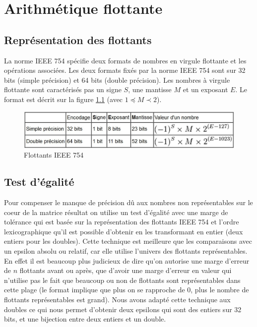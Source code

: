 \documentclass[a4paper, 10pt]{report}
\begin{document}
\chapter{Arithmétique flottante}
\label{chap:arith}

\section{Représentation des flottants}
La norme IEEE 754 spécifie deux formats de nombres en virgule flottante et les opérations associées.
Les deux formats fixés par la norme IEEE 754 sont sur 32 bits (simple précision) et 64 bits (double précision).
Les nombres à virgule flottante sont caractérisés pas un signe $S$, une mantisse $M$ et un exposant $E$.
Le format est décrit sur la figure \ref{fig:IEEE754} (avec $1 \preceq M \prec 2$).
\begin{figure}
\center
\includegraphics[scale=0.5]{IEEE754.jpg}
\caption{Flottants IEEE 754}
\label{fig:IEEE754}
\end{figure}

\section{Test d'égalité}
Pour compenser le manque de précision dû aux nombres non représentables sur le coeur de la matrice résultat on utilise un test d'égalité avec une marge de tolérance
qui est basée sur la représentation des flottants IEEE 754 et l'ordre lexicographique \cite{float} qu'il est possible d'obtenir en les transformant en entier (deux entiers pour les doubles).\newline
Cette technique est meilleure que les comparaisons avec un epsilon absolu ou relatif, car elle utilise l'univers des flottants représentables.\newline
En effet il est beaucoup plus judicieux de dire qu'on autorise une marge d'erreur de $n$ flottants avant ou après, que d'avoir une marge d'erreur en valeur qui n'utilise
pas le fait que beaucoup ou non de flottants sont représentables dans cette plage (le format implique que plus on se rapproche de 0, plus le nombre de flottants représentables est grand).\newline
Nous avons adapté cette technique aux doubles ce qui nous permet d'obtenir deux epsilons qui sont des entiers sur 32 bits, et une bijection entre deux entiers et un double.
\end{document}
